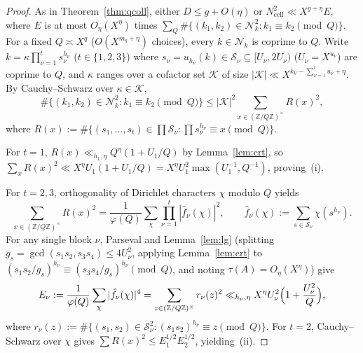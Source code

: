 \documentclass[11pt,a4paper]{amsart}
\theoremstyle{plain}
\theoremstyle{definition}
\theoremstyle{remark}
\newcommand{\Z}{\mathbb{Z}}
\begin{document}
\begin{proof}
As in Theorem~\ref{thm:qcoll}, either $D \le g + O(\eta)$ or $N_{\mathrm{cell}}^2 \ll X^{g + \eta} E$, where $E$ is at most $O_\eta(X^\eta)$ times $\sum_Q \#\{(k_1,k_2) \in \mathcal{N}_k^2 : k_1 \equiv k_2 \pmod Q\}$. For a fixed $Q \asymp X^q$ ($O(X^{m_q+\eta})$ choices), every $k \in \mathcal{N}_k$ is coprime to $Q$. Write $k = \kappa \prod_{\nu=1}^t s_\nu^{h_\nu}$ ($t \in \{1,2,3\}$) where $s_\nu = u_{h_\nu}(k) \in \mathcal{S}_\nu \subseteq [U_\nu, 2 U_\nu)$ ($U_\nu = X^{u_\nu}$) are coprime to $Q$, and $\kappa$ ranges over a cofactor set $\mathcal{K}$ of size $|\mathcal{K}| \ll X^{k_V - \sum_{\nu=1}^t u_\nu + \eta}$. By Cauchy--Schwarz over $\kappa \in \mathcal{K}$,
\[
  \#\{(k_1,k_2) \in \mathcal{N}_k^2 : k_1 \equiv k_2 \pmod Q\}
  \le |\mathcal{K}|^2 \sum_{x \in (\Z/Q\Z)^\times} R(x)^2,
\]
where $R(x) := \#\{(s_1,\dots,s_t) \in \prod \mathcal{S}_\nu : \prod s_\nu^{h_\nu} \equiv x \pmod Q\}$.

For $t = 1$, $R(x) \ll_{h_1,\eta} Q^\eta(1 + U_1/Q)$ by Lemma~\ref{lem:crt}, so $\sum_x R(x)^2 \ll X^\eta U_1(1 + U_1/Q) = X^\eta U_1^2 \max(U_1^{-1}, Q^{-1})$, proving~(i).

For $t = 2, 3$, orthogonality of Dirichlet characters $\chi$ modulo $Q$ yields
\[
  \sum_{x \in (\Z/Q\Z)^\times} R(x)^2 = \frac{1}{\varphi(Q)} \sum_\chi \prod_{\nu=1}^t |\hat{f}_\nu(\chi)|^2,
  \qquad \hat{f}_\nu(\chi) := \sum_{s \in \mathcal{S}_\nu} \chi(s^{h_\nu}).
\]
For any single block $\nu$, Parseval and Lemma~\ref{lem:lg} (splitting $g_s = \gcd(s_1 s_2, s_3 s_4) \le 4 U_\nu^2$, applying Lemma~\ref{lem:crt} to $(s_1 s_2/g_s)^{h_\nu} \equiv (s_3 s_4/g_s)^{h_\nu} \pmod Q$, and noting $\tau(A) = O_\eta(X^\eta)$) give
\begin{equation}\label{eq:mod_4th}
  E_\nu := \frac{1}{\varphi(Q)} \sum_\chi |\hat{f}_\nu(\chi)|^4
  = \sum_{z \in (\Z/Q\Z)^\times} r_\nu(z)^2
  \ll_{h_\nu,\eta} X^\eta U_\nu^2\Bigl(1 + \frac{U_\nu^2}{Q}\Bigr),
\end{equation}
where $r_\nu(z) := \#\{(s_1,s_2) \in \mathcal{S}_\nu^2 : (s_1 s_2)^{h_\nu} \equiv z \pmod Q\}$. For $t = 2$, Cauchy--Schwarz over $\chi$ gives $\sum R(x)^2 \le E_1^{1/2} E_2^{1/2}$, yielding~(ii).


\end{proof}
\end{document}
